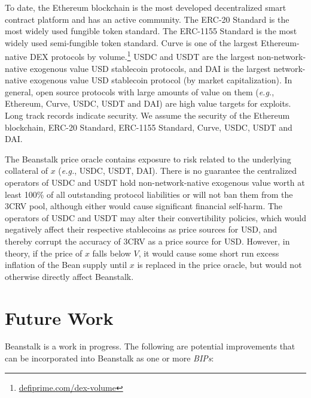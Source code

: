 \documentclass[tikz]{article}
\newcommand{\term}[1]{\textsl{#1}}
\newcommand{\fref}[1]{\footnote{\href{http://#1}{#1}}}
\begin{document}
To date, the Ethereum blockchain is the most developed decentralized smart contract platform and has an active community. The ERC-20 Standard is the most widely used fungible token standard. The ERC-1155 Standard is the most widely used semi-fungible token standard. Curve is one of the largest Ethereum-native DEX protocols by volume.\fref{defiprime.com/dex-volume} USDC and USDT are the largest non-network-native exogenous value USD stablecoin protocols, and DAI is the largest network-native exogenous value USD stablecoin protocol (by market capitalization). In general, open source protocols with large amounts of value on them (\term{e.g.}, Ethereum, Curve, USDC, USDT and DAI) are high value targets for exploits. Long track records indicate security. We assume the security of the Ethereum blockchain, ERC-20 Standard, ERC-1155 Standard, Curve, USDC, USDT and DAI.

\newpage
The Beanstalk price oracle contains exposure to risk related to the underlying collateral of \hyperlink{ht223}{$x$} (\term{e.g.}, USDC, USDT, DAI). There is no guarantee the centralized operators of USDC and USDT hold non-network-native exogenous value worth at least 100\% of all outstanding protocol liabilities or will not ban them from the 3CRV pool, although either would cause significant financial self-harm. The operators of USDC and USDT may alter their convertibility policies, which would negatively affect their respective stablecoins as price sources for USD, and thereby corrupt the accuracy of 3CRV as a price source for USD. However, in theory, if the price of \hyperlink{ht223}{$x$} falls below \hyperlink{ht216}{$V$}, it would cause some short run excess inflation of the Bean supply until \hyperlink{ht223}{$x$} is replaced in the price oracle, but would not otherwise directly affect Beanstalk.

\section{Future Work}
Beanstalk is a work in progress. The following are potential improvements that can be incorporated into Beanstalk as one or more \term{BIPs}:
\end{document}
